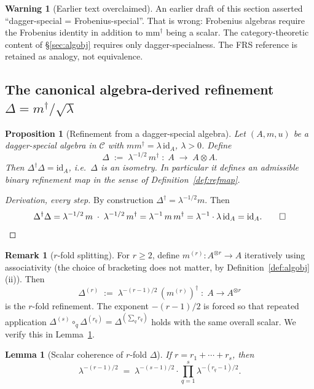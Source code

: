 \documentclass[11pt,a4paper]{article}
\newtheorem{lemma}[definition]{Lemma}
\newtheorem{proposition}[definition]{Proposition}
\theoremstyle{definition}
\newtheorem{remark}[definition]{Remark}
\newtheorem{warning}[definition]{Warning}
\newcommand{\Cc}{\mathcal{C}}
\newcommand{\id}{\mathrm{id}}
\begin{document}
\begin{warning}[Earlier text overclaimed]\label{warn:not-Frobenius}
An earlier draft of this section asserted ``dagger-special = Frobenius-special''.
That is wrong: Frobenius algebras require the Frobenius identity in addition
to mm$^\dagger$ being a scalar. The category-theoretic content of
\S\ref{sec:algobj} requires only dagger-specialness. The FRS reference is
retained as analogy, not equivalence.
\end{warning}

\subsection{The canonical algebra-derived refinement $\Delta = m^\dagger/\sqrt\lambda$}

\begin{proposition}[Refinement from a dagger-special algebra]\label{prop:Delta-isom}
Let $(A,m,u)$ be a dagger-special algebra in $\Cc$ with $mm^{\dagger}
= \lambda\,\id_A$, $\lambda>0$. Define
\[
\Delta \;:=\; \lambda^{-1/2}\,m^{\dagger}\;:\;A\;\longrightarrow\;A\otimes A.
\]
Then $\Delta^{\dagger}\Delta = \id_A$, i.e.\ $\Delta$ is an isometry. In
particular it defines an admissible binary refinement map in the sense of
Definition~\ref{def:refmap}.
\end{proposition}

\begin{proof}[Derivation, every step]
By construction $\Delta^{\dagger} = \lambda^{-1/2}m$. Then
\[
\Delta^{\dagger}\Delta
= \lambda^{-1/2}\,m \;\cdot\; \lambda^{-1/2}\,m^{\dagger}
= \lambda^{-1}\,m\,m^{\dagger}
= \lambda^{-1}\cdot\lambda\,\id_A
= \id_A. \qed
\]
\renewcommand{\qedsymbol}{}
\end{proof}

\begin{remark}[$r$-fold splitting]
For $r\ge 2$, define $m^{(r)}:A^{\otimes r}\to A$ iteratively using
associativity (the choice of bracketing does not matter, by
Definition~\ref{def:algobj}(ii)). Then
\[
\Delta^{(r)} \;:=\; \lambda^{-(r-1)/2}\,(m^{(r)})^{\dagger}\;:\;A\to A^{\otimes r}
\]
is the $r$-fold refinement. The exponent $-(r-1)/2$ is forced so that
repeated application $\Delta^{(s)}\circ_q \Delta^{(r_q)} = \Delta^{(\sum_q r_q)}$
holds with the same overall scalar. We verify this in
Lemma~\ref{lem:scalar-compose}.
\end{remark}

\begin{lemma}[Scalar coherence of $r$-fold $\Delta$]\label{lem:scalar-compose}
If $r = r_1+\cdots+r_s$, then
\[
\lambda^{-(r-1)/2}
\;=\; \lambda^{-(s-1)/2}\cdot\prod_{q=1}^{s}\lambda^{-(r_q-1)/2}.
\]
\end{lemma}
\end{document}
